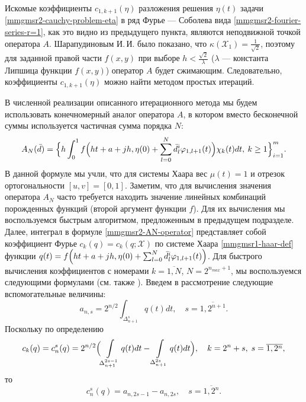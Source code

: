 Искомые коэффициенты $c_{1,k+1}(\eta)$ разложения решения $\eta(t)$ задачи \eqref{mmgmsr2-cauchy-problem-eta} в ряд Фурье --- Соболева вида \eqref{mmgmsr2-fourier-series-r=1}, как это видно из предыдущего пункта, являются неподвижной точкой оператора $A$. Шарапудиновым И.\,И. было показано, что $\kappa(\mathcal{X}_1)=\frac{1}{\sqrt{2}}$, поэтому для заданной правой части $f(x,y)$ при выборе $h<\frac{\sqrt{2}}{\lambda}$ ($\lambda$ --- константа Липшица функции $f(x,y)$) оператор $A$ будет сжимающим. Следовательно, коэффициенты $c_{1,k+1}(\eta)$ можно найти методом простых итераций.

В численной реализации описанного итерационного метода мы будем использовать конечномерный аналог оператора $A$, в котором вместо бесконечной суммы используется частичная сумма порядка $N$:
\begin{equation}\label{mmgmsr2-AN-operator}
A_N(\bar{d})=
\Bigl\{
h\int_{0}^{1}f\Bigl(ht + a + jh,\eta(0)+ \sum_{l=0}^N \bar{d}^i_l \varphi_{1,l+1}(t)\Bigr)\chi_{k}(t)dt,
\: k \ge 1
\Bigr\}_{i=1}^m.
\end{equation}
В данной формуле мы учли, что для системы Хаара вес $\mu(t)=1$ и отрезок ортогональности $[u,v]=[0,1]$. Заметим, что для вычисления значения оператора $A_N$ часто требуется находить значение линейных комбинаций порожденных функций (второй аргумент функции $f$). Для их вычисления мы воспользуемся быстрым алгоритмом, предложенным в предыдущем подразделе. Далее, интеграл в формуле \eqref{mmgmsr2-AN-operator} представляет собой коэффициент Фурье $c_k(q)=c_k(q; \mathcal{X})$ по системе Хаара \eqref{mmgmsr1-haar-def} функции $q(t)=f\Bigl(ht + a + jh,\eta(0)+ \sum_{l=0}^N \bar{d}^i_l \varphi_{1,l+1}(t)\Bigr)$. Для быстрого вычисления коэффициентов с номерами $k=\overline{1,N}$, $N=2^{n_{max}+1}$, мы воспользуемся следующими формулами (см. также \cite[c. 47]{mmgmsr2-bib-farcov}). Введем в рассмотрение следующие вспомогательные величины:
\begin{equation}\label{mmgmsr2-a-coeffs}
a_{n,s} = 2^{n/2} \int_{\Delta^s_{n+1}} q(t)dt, \quad s = \overline{1,2^{n+1}}.
\end{equation}
Поскольку по определению
\begin{equation*}
c_k(q)=c_n^s(q)=2^{n/2}\Bigl(
\int\limits_{\Delta_{n+1}^{2s-1}}q(t)dt-
\int\limits_{\Delta_{n+1}^{2s}}q(t)dt
\Bigr), \quad k=2^n+s, \; s=\overline{1,2^n},
\end{equation*}
то
\begin{equation}\label{mmgmsr2-haar-coeffs-using-a}
c_n^s(q)=a_{n,2s-1}-a_{n,2s},
\quad s = \overline{1,2^{n}}.
\end{equation}
